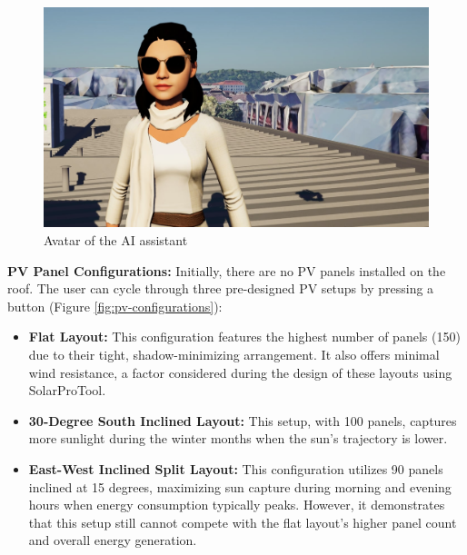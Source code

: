 \documentclass[draft, final]{vutinfth} %
\begin{document}
\begin{figure}
    \centering
    \includegraphics[width=\textwidth]{graphics/ai.jpg}
    \caption{Avatar of the AI assistant}
    \label{fig:ai-avatar}
\end{figure}

\textbf{PV Panel Configurations:} Initially, there are no PV panels installed on the roof. The user can cycle through three pre-designed PV setups by pressing a button (Figure \ref{fig:pv-configurations}):

\begin{itemize}
    \item \textbf{Flat Layout:} This configuration features the highest number of panels (150) due to their tight, shadow-minimizing arrangement. It also offers minimal wind resistance, a factor considered during the design of these layouts using SolarProTool.
    \item \textbf{30-Degree South Inclined Layout:} This setup, with 100 panels, captures more sunlight during the winter months when the sun's trajectory is lower.
    \item \textbf{East-West Inclined Split Layout:} This configuration utilizes 90 panels inclined at 15 degrees, maximizing sun capture during morning and evening hours when energy consumption typically peaks. However, it demonstrates that this setup still cannot compete with the flat layout's higher panel count and overall energy generation.
\end{itemize}
\end{document}
